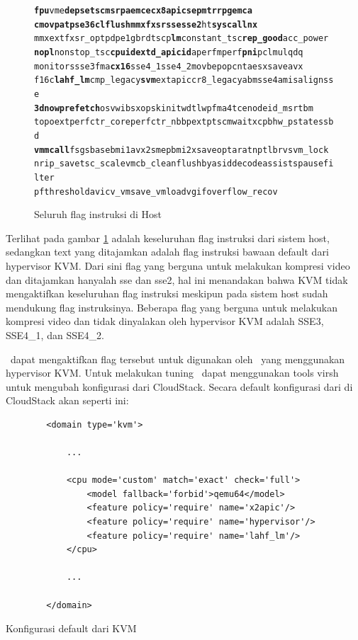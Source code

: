 \begin{figure}
	\begin{alltt}
		\textbf{fpu} vme \textbf{de pse tsc msr pae mce cx8 apic sep mtrr pge mca} 
		\textbf{cmov pat pse36 clflush mmx fxsr sse sse2} ht \textbf{syscall nx} 
		mmxext fxsr_opt pdpe1gb rdtscp \textbf{lm} constant_tsc \textbf{rep_good} acc_power
		\textbf{nopl} nonstop_tsc \textbf{cpuid}  \textbf{extd_apicid} aperfmperf \textbf{pni} pclmulqdq 
		monitor ssse3 fma \textbf{cx16} sse4_1  sse4_2 movbe popcnt aes xsave avx 
		f16c \textbf{lahf_lm} cmp_legacy \textbf{svm} extapic cr8_legacy abm sse4a misalignsse
		\textbf{3dnowprefetch} osvw ibs xop skinit wdt lwp fma4 tce nodeid_msr tbm
		topoext perfctr_core perfctr_nb bpext ptsc mwaitx cpb hw_pstate ssbd 
		\textbf{vmmcall} fsgsbase bmi1 avx2 smep bmi2 xsaveopt arat npt lbrv svm_lock
		nrip_save tsc_scale vmcb_clean flushbyasid decodeassists pausefilter 
		pfthreshold avic v_vmsave_vmload vgif overflow_recov
	\end{alltt}
	\caption{Seluruh flag instruksi di Host}
	\label{fig:flag_kvm_host}
\end{figure}

Terlihat pada gambar \ref{fig:flag_kvm_host} adalah keseluruhan flag instruksi dari sistem host, sedangkan text yang ditajamkan adalah flag instruksi bawaan default dari hypervisor KVM. Dari sini flag yang berguna untuk melakukan kompresi video dan ditajamkan hanyalah sse dan sse2, hal ini menandakan bahwa KVM tidak mengaktifkan keseluruhan flag instruksi meskipun pada sistem host sudah mendukung flag instruksinya. Beberapa flag yang berguna untuk melakukan kompresi video dan tidak dinyalakan oleh hypervisor KVM adalah SSE3, SSE4\_1, dan SSE4\_2. 

\saya\ dapat mengaktifkan flag tersebut untuk digunakan oleh \vm\ yang menggunakan hypervisor KVM. Untuk melakukan tuning \saya\ dapat menggunakan tools virsh untuk mengubah konfigurasi \vm dari CloudStack. Secara default konfigurasi dari \vm di CloudStack akan seperti ini:

\begin{listing}[H]
	\begin{verbatim}
		<domain type='kvm'>
		
			...
			
			<cpu mode='custom' match='exact' check='full'>
				<model fallback='forbid'>qemu64</model>
				<feature policy='require' name='x2apic'/>
				<feature policy='require' name='hypervisor'/>
				<feature policy='require' name='lahf_lm'/>
			</cpu>
			
			...
			
		</domain>
	\end{verbatim}
	\caption{Konfigurasi default dari KVM}
	\label{code:default_kvm_xml}
\end{listing}

